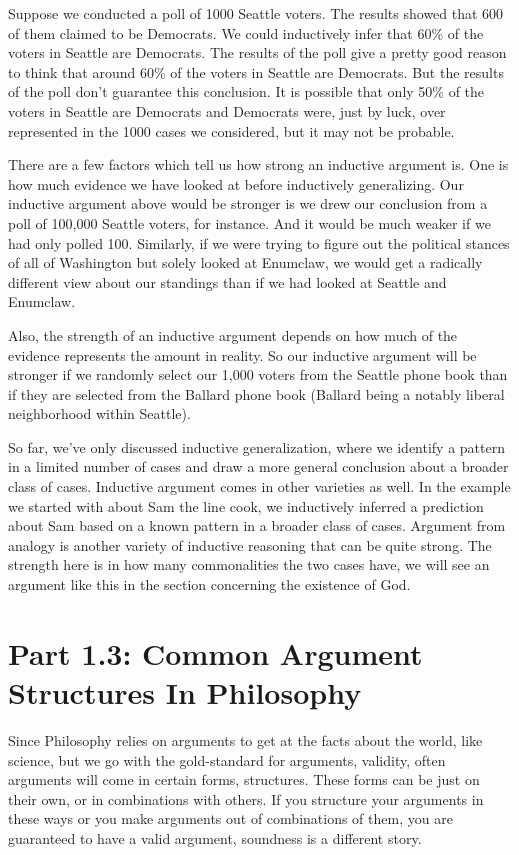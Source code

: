     Suppose we conducted a poll of 1000 Seattle voters. The results showed that 600 of them claimed to be Democrats. We could inductively infer that 60\% of the voters in Seattle are Democrats. The results of the poll give a pretty good reason to think that around 60\% of the voters in Seattle are Democrats. But the results of the poll don’t guarantee this conclusion. It is possible that only 50\% of the voters in Seattle are Democrats and Democrats were, just by luck, over represented in the 1000 cases we considered, but it may not be probable.

There are a few factors which tell us how strong an inductive argument is. One is how much evidence we have looked at before inductively generalizing. Our inductive argument above would be stronger is we drew our conclusion from a poll of 100,000 Seattle voters, for instance. And it would be much weaker if we had only polled 100. Similarly, if we were trying to figure out the political stances of all of Washington but solely looked at Enumclaw, we would get a radically different view about our standings than if we had looked at Seattle and Enumclaw.

Also, the strength of an inductive argument depends on how much of the evidence represents the amount in reality. So our inductive argument will be stronger if we randomly select our 1,000 voters from the Seattle phone book than if they are selected from the Ballard phone book (Ballard being a notably liberal neighborhood within Seattle).

So far, we’ve only discussed inductive generalization, where we identify a pattern in a limited number of cases and draw a more general conclusion about a broader class of cases. Inductive argument comes in other varieties as well. In the example we started with about Sam the line cook, we inductively inferred a prediction about Sam based on a known pattern in a broader class of cases. Argument from analogy is another variety of inductive reasoning that can be quite strong. The strength here is in how many commonalities the two cases have, we will see an argument like this in the section concerning the existence of God.

\section{Part 1.3: Common Argument Structures In Philosophy}
\label{s:p1.3}

Since Philosophy relies on arguments to get at the facts about the world, like science, but we go with the gold-standard for arguments, validity, often arguments will come in certain forms, structures. These forms can be just on their own, or in combinations with others. If you structure your arguments in these ways or you make arguments out of combinations of them, you are guaranteed to have a valid argument, soundness is a different story. 

